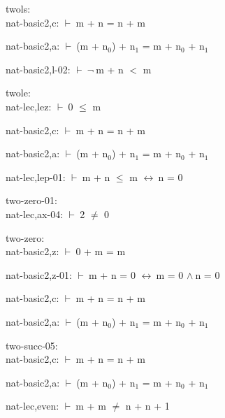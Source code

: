 \documentclass[a4paper]{article}
\newcommand{\Fol}{\mbox{$\vdash\ $}}
\newcommand{\Not}{\mbox{$\neg\ $}}
\newcommand{\And}{\mbox{$\wedge\ $}}
\newcommand{\Equiv}{\mbox{$\leftrightarrow\ $}}
\begin{document}
\bigskip

twols:\\ nat-basic2,c: 
 \Fol m + n = n + m



nat-basic2,a: 
 \Fol (m + $\mbox{n}_{0}$) + $\mbox{n}_{1}$ = m + $\mbox{n}_{0}$ + $\mbox{n}_{1}$



nat-basic2,l-02: 
 \Fol \Not m + n $<$ m



\bigskip

twole:\\ nat-lec,lez: 
 \Fol 0 $\le$ m



nat-basic2,c: 
 \Fol m + n = n + m



nat-basic2,a: 
 \Fol (m + $\mbox{n}_{0}$) + $\mbox{n}_{1}$ = m + $\mbox{n}_{0}$ + $\mbox{n}_{1}$



nat-lec,lep-01: 
 \Fol m + n $\le$ m \Equiv n = 0



\bigskip

two-zero-01:\\ nat-lec,ax-04: 
 \Fol 2 $\neq$ 0



\bigskip

two-zero:\\ nat-basic2,z: 
 \Fol 0 + m = m



nat-basic2,z-01: 
 \Fol m + n = 0 \Equiv m = 0 \And n = 0



nat-basic2,c: 
 \Fol m + n = n + m



nat-basic2,a: 
 \Fol (m + $\mbox{n}_{0}$) + $\mbox{n}_{1}$ = m + $\mbox{n}_{0}$ + $\mbox{n}_{1}$



\bigskip

two-succ-05:\\ nat-basic2,c: 
 \Fol m + n = n + m



nat-basic2,a: 
 \Fol (m + $\mbox{n}_{0}$) + $\mbox{n}_{1}$ = m + $\mbox{n}_{0}$ + $\mbox{n}_{1}$



nat-lec,even: 
 \Fol m + m $\neq$ n + n + 1



\bigskip
\end{document}
